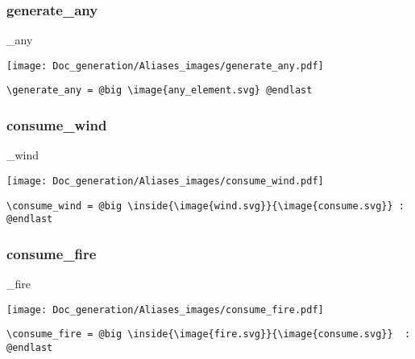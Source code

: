 \documentclass{article}
\begin{document}
\subsubsection{generate\_any}
\begin{minipage}{0.45\linewidth}
\raggedright
\begin{spverbatim}
\generate_any
\end{spverbatim}
\end{minipage}
\begin{minipage}{0.45\linewidth}
\raggedleft
\texttt{[image: Doc\_generation/Aliases\_images/generate\_any.pdf]}
\end{minipage}
\begin{center}
\begin{BVerbatim}
\generate_any = @big \image{any_element.svg} @endlast
\end{BVerbatim}
\end{center}

\subsubsection{consume\_wind}
\begin{minipage}{0.45\linewidth}
\raggedright
\begin{spverbatim}
\consume_wind
\end{spverbatim}
\end{minipage}
\begin{minipage}{0.45\linewidth}
\raggedleft
\texttt{[image: Doc\_generation/Aliases\_images/consume\_wind.pdf]}
\end{minipage}
\begin{center}
\begin{BVerbatim}
\consume_wind = @big \inside{\image{wind.svg}}{\image{consume.svg}} : @endlast
\end{BVerbatim}
\end{center}

\subsubsection{consume\_fire}
\begin{minipage}{0.45\linewidth}
\raggedright
\begin{spverbatim}
\consume_fire
\end{spverbatim}
\end{minipage}
\begin{minipage}{0.45\linewidth}
\raggedleft
\texttt{[image: Doc\_generation/Aliases\_images/consume\_fire.pdf]}
\end{minipage}
\begin{center}
\begin{BVerbatim}
\consume_fire = @big \inside{\image{fire.svg}}{\image{consume.svg}}  : @endlast
\end{BVerbatim}
\end{center}
\end{document}
